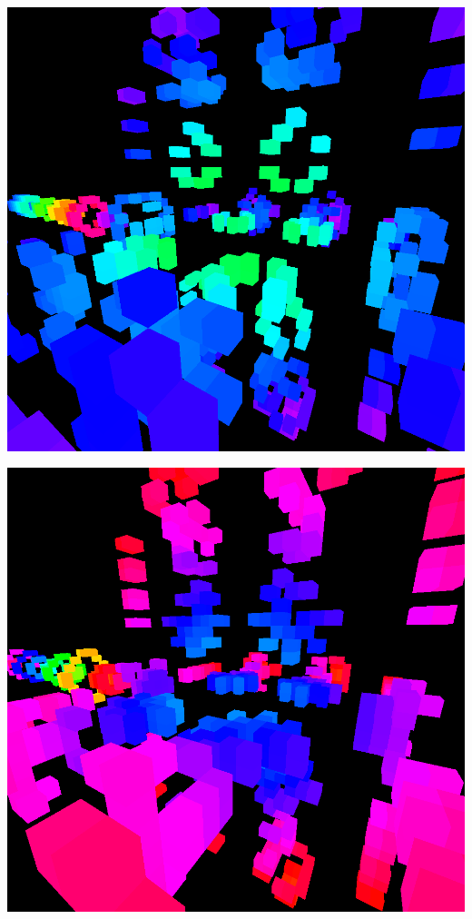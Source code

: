 \documentclass[11pt]{article}
\begin{document}
\begin{center}
\includegraphics[width=.9\linewidth]{img/4-3.png}
\end{center}

\begin{center}
\includegraphics[width=.9\linewidth]{img/5-3.png}
\end{center}
\end{document}
